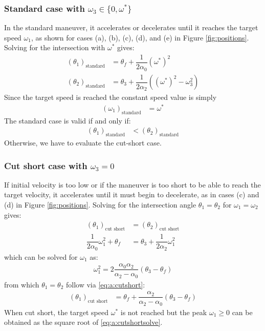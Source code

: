 \documentclass[12pt, a4paper]
{article}
\providecommand{\lr}[1]{\left(#1\right)}
\providecommand{\sub}[1]{_{\text{#1}}}
\providecommand{\w}{\omega}
\providecommand{\wt}{\w^*}
\renewcommand{\th}{\theta}
\renewcommand{\a}{\alpha}
\providecommand{\w}{\omega}
\begin{document}
\subsubsection{Standard case with $\w_3 \in \{0, \wt\}$}
\label{sec:a:standard}
In the standard maneuver, it accelerates or decelerates
until it reaches the target speed $\w_1$, as shown for cases (a), (b), (c),
(d), and (e) in Figure \ref{fig:positions}. 
Solving for the intersection with $\wt$ gives:
%
\begin{align}
    \label{eq:a:t1mt0:standard}
    \lr{\th_1}\sub{standard} &= \th_f  + \dfrac{1}{2\a_0}(\wt)^2\\[1em]
    \lr{\th_2}\sub{standard} &= \th_3  + \dfrac{1}{2\a_2}\lr{(\wt)^2 - \w_3^2}
\end{align}
%
%
Since the target speed is reached the constant speed value is simply
\begin{align}
    \lr{\w_1}\sub{standard} &= \wt
\end{align}
%
The standard case is valid if and only if:
\begin{align}
    \label{eq:a:t1mt0:standardvalidity}
    \lr{\th_1}\sub{standard} &< \lr{\th_2}\sub{standard}
\end{align}
%
Otherwise, we have to evaluate the cut-short case.
%

\subsubsection{Cut short case with $\w_3 = 0$}
\label{sec:a:cutshortw3is0}
If initial velocity is too low or if the
maneuver is too short to be able to reach the target velocity, it accelerates
until it must begin to decelerate, as in cases (c) and (d) in
Figure \ref{fig:positions}.
Solving for the intersection angle $\th_1=\th_2$ for $\w_1=\w_2$ gives:
%
\begin{align}
    \label{eq:a:cutshort}
    \lr{\th_1}\sub{cut short} &= \lr{\th_2}\sub{cut short}\\[1em]
    \dfrac{1}{2\a_0}\w_1^2 + \th_f  &= \th_3 + \dfrac{1}{2\a_2} \w_1^2 
\end{align}
%
which can be solved for $\w_1$ as:
%
\begin{align}
    \label{eq:a:cutshortsolve}
    \w_1^2 = 2 \dfrac{\a_0\a_2}{\a_2-\a_0}\lr{\th_3 - \th_f}
\end{align}
%
from which $\th_1=\th_2$ follow via \eqref{eq:a:cutshort}:
%
\begin{align}
    \label{eq:a:cutshortr}
    \lr{\th_1}\sub{cut short}
    &=\th_f + \dfrac{\a_2}{\a_2-\a_0}\lr{\th_3 - \th_f}
\end{align}
%
When cut short, the target speed $\wt$ is not reached but the
peak $\w_1 \geq 0$ can be obtained as the square root
of \eqref{eq:a:cutshortsolve}.
%
\end{document}
